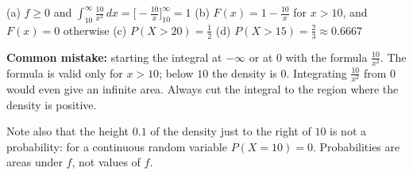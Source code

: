 \begin{solution}
	\begin{answer}
		(a) $f\ge0$ and $\int_{10}^{\infty}\frac{10}{x^2}\,dx
			=\bigl[-\frac{10}{x}\bigr]_{10}^{\infty}=1$ \newline
		(b) $F(x)=1-\frac{10}{x}$ for $x>10$, and $F(x)=0$ otherwise \newline
		(c) $P(X>20)=\frac12$ \quad
		(d) $P(X>15)=\frac23\approx0.6667$
	\end{answer}
	\begin{remark}
		\textbf{Common mistake:} starting the integral at $-\infty$ or at $0$
		with the formula $\frac{10}{x^2}$. The formula is valid only for
		$x>10$; below $10$ the density is $0$. Integrating $\frac{10}{x^2}$
		from $0$ would even give an infinite area. Always cut the integral to
		the region where the density is positive.

		Note also that the height $0.1$ of the density just to the right of
		$10$ is not a probability: for a continuous
		random variable $P(X=10)=0$. Probabilities are areas under $f$, not
		values of $f$.
	\end{remark}
\end{solution}
